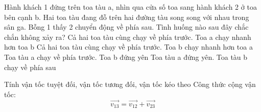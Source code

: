 \begin{vd}
	Hành khách 1 đứng trên toa tàu a, nhìn qua cửa số toa sang hành khách 2 ở toa bên cạnh b. Hai toa tàu đang đỗ trên hai đường tàu song song với nhau trong sân ga. Bỗng 1 thấy 2 chuyển động về phía sau. Tình huống nào sau đây chắc chắn không xảy ra?
	\choice
	{Cả hai toa tàu cùng chạy về phía trước. Toa a chạy nhanh hơn toa b}
	{\True Cả hai toa tàu cùng chạy về phía trước. Toa b chạy nhanh hơn toa a}
	{Toa tàu a chạy về phía trước. Toa b đứng yên}
	{Toa tàu a đứng yên. Toa tàu b chạy về phía sau}
\end{vd}
\begin{dang}{Tính vận tốc tuyệt đối, vận tốc tương đối, vận tốc kéo theo}
	Công thức cộng vận tốc:
	$$\overrightarrow{v_{13}}=\overrightarrow{v_{12}}+\overrightarrow{v_{23}}$$
\end{dang}
